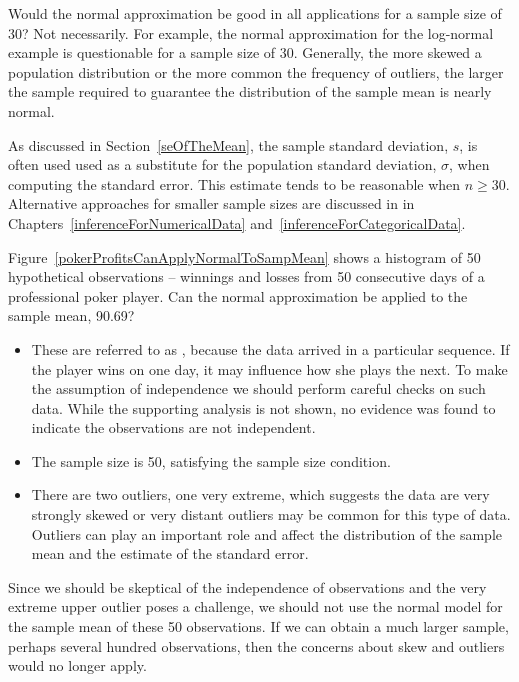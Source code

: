 \begin{spacing}{1.5}
\begin{example}{Would the normal approximation be good in all applications for a sample size of 30?}
Not necessarily. For example, the normal approximation for the log-normal example is questionable for a sample size of 30. Generally, the more skewed a population distribution or the more common the frequency of outliers, the larger the sample required to guarantee the distribution of the sample mean is nearly normal.
\end{example}

As discussed in Section~\ref{seOfTheMean}, the sample standard deviation, $s$, is often used  used as a substitute for the population standard deviation, $\sigma$, when computing the standard error. This estimate tends to be reasonable when $n\geq30$. Alternative approaches for smaller sample sizes are discussed in in Chapters~\ref{inferenceForNumericalData} and~\ref{inferenceForCategoricalData}.


\begin{example}{Figure~\ref{pokerProfitsCanApplyNormalToSampMean} shows a histogram of 50  hypothetical observations --  winnings and losses from 50 consecutive days of a professional poker player. Can the normal approximation be applied to the sample mean, 90.69?}

\begin{itemize}
\setlength{\itemsep}{0mm}
\item[(1)] These are referred to as , because the data arrived in a particular sequence. If the player wins on one day, it may influence how she plays the next. To make the assumption of independence we should perform careful checks on such data. While the supporting analysis is not shown, no evidence was found to indicate the observations are not independent.
\item[(2)] The sample size is 50, satisfying the sample size condition.
\item[(3)] There are two outliers, one very extreme, which suggests the data are very strongly skewed or very distant outliers may be common for this type of data. Outliers can play an important role and affect the distribution of the sample mean and the estimate of the standard error.
\end{itemize}
Since we should be skeptical of the independence of observations and the very extreme upper outlier poses a challenge, we should not use the normal model for the sample mean of these 50 observations. If we can obtain a much larger sample, perhaps several hundred observations, then the concerns about skew and outliers would no longer apply.
\end{example}


\end{spacing}
